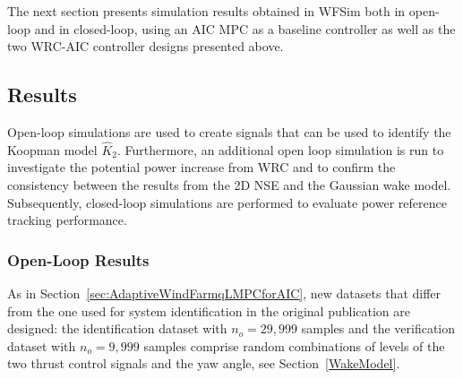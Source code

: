 The next section presents simulation results obtained in WFSim both in open-loop and in closed-loop, using an AIC MPC as a baseline controller as well as the two WRC-AIC controller designs presented above.

\subsection{Results} \label{SimResults}
Open-loop simulations are used to create signals that can be used to identify the Koopman model $\hat{K}_2$. Furthermore, an additional open loop simulation is run to investigate the potential power increase from WRC and to confirm the consistency between the results from the 2D NSE and the Gaussian wake model. Subsequently, closed-loop simulations are performed to evaluate power reference tracking performance.


\subsubsection{Open-Loop Results}
As in Section~\ref{sec:AdaptiveWindFarmqLMPCforAIC}, new datasets that differ from the one used for system identification in the original publication \cite{dittmer2023koopman} are designed: the identification dataset with $n_o = 29,999$ samples and the verification dataset with $n_o = 9,999$ samples comprise random combinations of levels of the two thrust control signals and the yaw angle, see Section~\ref{WakeModel}.

